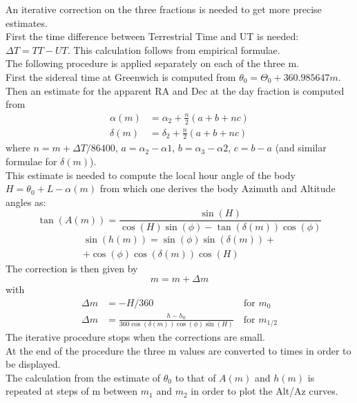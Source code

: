 \documentclass[a4paper]{article}
\begin{document}
\begin{multicols}{2}
		An iterative correction on the three fractions is needed to get more precise estimates.\\
		First the time difference between Terrestrial Time and UT is needed: $\Delta T = TT - UT$. This calculation follows from empirical formulae.\\
		The following procedure is applied separately on each of the three m.\\
		First the sidereal time at Greenwich is computed from $\theta_0 = \Theta_0 + 360.985647m$.\\
		Then an estimate for the apparent RA and Dec at the day fraction is computed from
		\begin{align}
			\alpha(m) &= \alpha_2 + \frac{n}{2}(a + b + nc)\\
			\delta(m) &= \delta_2 + \frac{n}{2}(a + b + nc)
		\end{align}
		where $n = m + \Delta T/86400$, $a = \alpha_2 - \alpha1$, $b = \alpha_3 - \alpha2$, $c = b - a$ (and similar formulae for $\delta(m)$).\\
		This estimate is needed to compute the local hour angle of the body $H = \theta_0 + L - \alpha(m)$ from which one derives the body Azimuth and Altitude angles as:
		\begin{equation}
			\tan(A(m)) = \frac{\sin(H)}{\cos(H)\sin(\phi)-\tan(\delta(m))\cos(\phi)}
		\end{equation}
		\begin{multline}
			\sin(h(m)) = \sin(\phi)\sin(\delta(m)) + \\+\cos(\phi)\cos(\delta(m))\cos(H)
		\end{multline}
		\vfill\null
		\columnbreak
		The correction is then given by
		\begin{equation}
			m = m + \Delta m
		\end{equation}
		with
		\begin{align}
			\Delta m &= - H/360 \qquad\qquad\qquad\quad\quad\quad\textrm{ for }m_0\\
			\Delta m &= \frac{h - h_0}{360\cos(\delta(m))\cos(\phi)\sin(H)} \quad\textrm{for }m_{1/2}
		\end{align}
		The iterative procedure stops when the corrections are small.\\
		
		At the end of the procedure the three m values are converted to times in order to be displayed.\\
		The calculation from the estimate of $\theta_0$ to that of $A(m)$ and $h(m)$ is repeated at steps of m between $m_1$ and $m_2$ in order to plot the Alt/Az curves.
	\end{multicols}
	\vspace{0.4\textheight}
\end{document}
